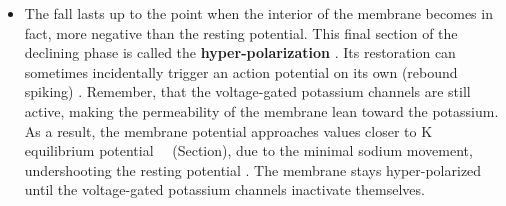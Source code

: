 \documentclass[class={myRUCProject}, crop=false]{standalone}
\begin{document}
\begin{itemize}
\item The fall lasts up to the point when the interior of the membrane becomes in fact, more negative than the resting potential. This final section of the declining phase is called the \textbf{hyper-polarization} \cite{wood1996neuroscience}. Its restoration can sometimes incidentally trigger an action potential on its own (rebound spiking) \cite{ramachandran2002encyclopedia}. Remember, that the voltage-gated potassium channels are still active, making the permeability of the membrane lean toward the potassium. As a result, the membrane potential approaches values closer to \gls{K} equilibrium potential \unit{\equi\potassium}\, (Section), due to the minimal sodium movement, undershooting the resting potential \cite{wood1996neuroscience}. The membrane stays hyper-polarized until the voltage-gated potassium channels inactivate themselves.
\end{itemize}






\end{document}
